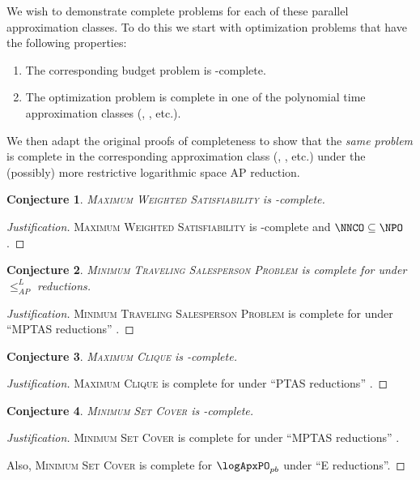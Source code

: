 \documentclass[]{article}
\theoremstyle{plain}
\newtheorem{conjecture}{Conjecture}
\theoremstyle{definition}
\newenvironment{justification}{\begin{proof}[Justification]}{\end{proof}}
\newcommand{\APr}{\leq_{AP}^{L}}
\begin{document}
We wish to demonstrate complete problems for each of these parallel approximation classes.
To do this we start with optimization problems that have the following properties:
\begin{enumerate}
\item The corresponding budget problem is \NP-complete.
\item The optimization problem is complete in one of the polynomial time approximation classes (\ApxPO, \PTAS, etc.).
\end{enumerate}
We then adapt the original proofs of completeness to show that the \emph{same problem} is complete in the corresponding \NC{} approximation class (\ApxNCO, \NCAS, etc.) under the (possibly) more restrictive logarithmic space AP reduction.

\begin{conjecture}
  \textsc{Maximum Weighted Satisfiability} is \NNCO-complete.
\end{conjecture}
\begin{justification}
  \textsc{Maximum Weighted Satisfiability} is \NPO-complete \cite{ckst95} and $\NNCO\subseteq\NPO$.
\end{justification}

\begin{conjecture}
  \textsc{Minimum Traveling Salesperson Problem} is complete for \expApxNCO{} under $\APr$ reductions.
\end{conjecture}
\begin{justification}
  \textsc{Minimum Traveling Salesperson Problem} is complete for \expApxPO{} under ``MPTAS reductions'' \cite[Corollary~1]{ep06}.
\end{justification}

\begin{conjecture}
  \textsc{Maximum Clique} is \polyApxNCO-complete.
\end{conjecture}
\begin{justification}
  \textsc{Maximum Clique} is complete for \polyApxPO{} under ``PTAS reductions'' \cite[Example~2.48]{cks01} \cite{kmsv99} \cite{ep10}.
\end{justification}

\begin{conjecture}
  \textsc{Minimum Set Cover} is \logApxNCO-complete.
\end{conjecture}
\begin{justification}
  \textsc{Minimum Set Cover} is complete for \logApxPO{} under ``MPTAS reductions'' \cite[Example~2.48]{cks01} \cite[Theorem~5]{ep06} \cite[Theorem~27]{ep10}.

  Also, \textsc{Minimum Set Cover} is complete for $\logApxPO_{pb}$ under ``E reductions''.
\end{justification}
\end{document}
